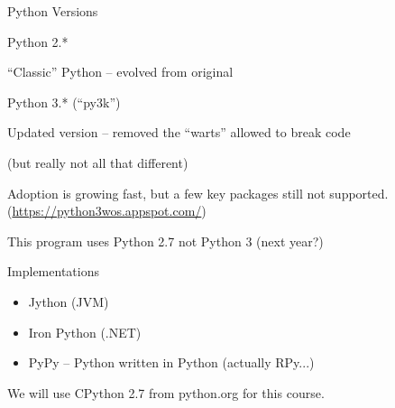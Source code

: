 \documentclass{beamer}
\begin{document}
\begin{frame}{Python Versions}

{\Large Python 2.*}

``Classic'' Python -- evolved from original

\vfill
{\Large Python 3.* (``py3k'')}

Updated version -- removed the ``warts'' allowed to break code

(but really not all that different)

Adoption is growing fast, but a few key packages still not supported.
(\url{https://python3wos.appspot.com/})

\vfill
This program uses Python 2.7 not Python 3 (next year?)

\end{frame}


\begin{frame}{Implementations}

\begin{itemize}
    \item Jython (JVM)
    \item Iron Python (.NET)
    \item PyPy -- Python written in Python (actually RPy...)
\end{itemize}

\vspace{0.25in}
  We will use CPython 2.7 from python.org for this course.

\end{frame}
\end{document}
